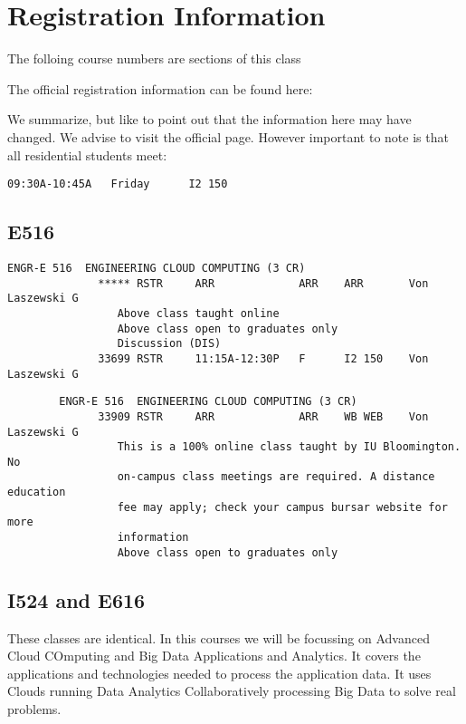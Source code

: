 \section{Registration Information}\label{registration-information}

The folloing course numbers are sections of this class

The official registration information can be found here:


We summarize, but like to point out that the information here may have
changed. We advise to visit the official page. However important to note
is that all residential students meet:

\begin{verbatim}
09:30A-10:45A   Friday      I2 150 
\end{verbatim}

\subsection{E516}

\begin{verbatim}
ENGR-E 516  ENGINEERING CLOUD COMPUTING (3 CR)
              ***** RSTR     ARR             ARR    ARR       Von Laszewski G
                 Above class taught online
                 Above class open to graduates only
                 Discussion (DIS)
              33699 RSTR     11:15A-12:30P   F      I2 150    Von Laszewski G
\end{verbatim}

\begin{verbatim}
        ENGR-E 516  ENGINEERING CLOUD COMPUTING (3 CR)
              33909 RSTR     ARR             ARR    WB WEB    Von Laszewski G
                 This is a 100% online class taught by IU Bloomington. No
                 on-campus class meetings are required. A distance education
                 fee may apply; check your campus bursar website for more
                 information
                 Above class open to graduates only
\end{verbatim}

\subsection{I524 and E616}

These classes are identical. In this courses we will be focussing on
Advanced Cloud COmputing and Big Data Applications and Analytics.  It
covers the applications and technologies needed to process the
application data. It uses Clouds running Data Analytics
Collaboratively processing Big Data to solve real problems.

